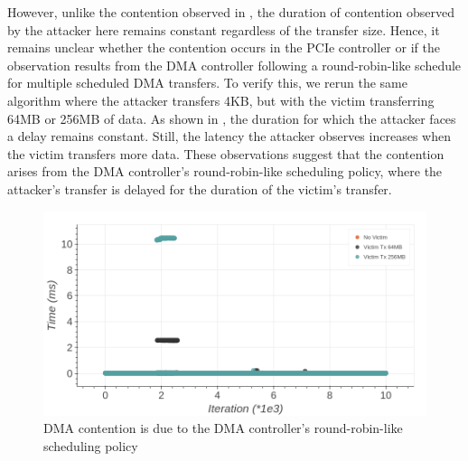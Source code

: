 However, unlike the contention observed in , the duration of contention observed by the attacker here remains constant regardless of the transfer size.
Hence, it remains unclear whether the contention occurs in the PCIe controller or if the observation results from the DMA controller following a round-robin-like schedule for multiple scheduled DMA transfers.
To verify this, we rerun the same algorithm where the attacker transfers 4KB, but with the victim transferring 64MB or 256MB of data.
As shown in , the duration for which the attacker faces a delay remains constant.
Still, the latency the attacker observes increases when the victim transfers more data.
These observations suggest that the contention arises from the DMA controller's round-robin-like scheduling policy, where the attacker's transfer is delayed for the duration of the victim's transfer.

\begin{figure}[!htb]
    \centering
    \includegraphics[width=\textwidth]{figures/interconnect-sc/dma/dma_contention_round_robin.png}
    \caption{DMA contention is due to the DMA controller's round-robin-like scheduling policy}
    \label{fig:dma-contention-round-robin}
\end{figure}